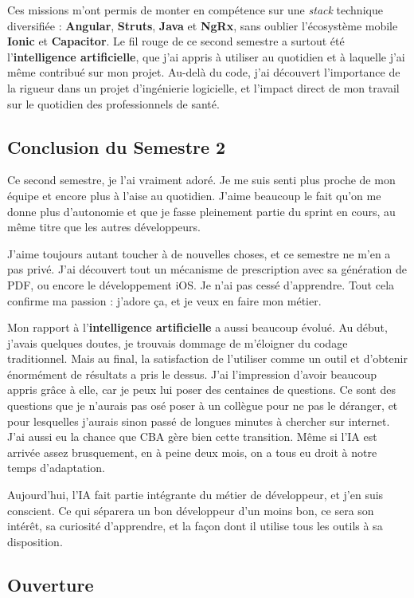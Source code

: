 \documentclass{article}
\begin{document}
Ces missions m'ont permis de monter en compétence sur une \textit{stack} technique diversifiée : \textbf{Angular}, \textbf{Struts}, \textbf{Java} et \textbf{NgRx}, sans oublier l'écosystème mobile \textbf{Ionic} et \textbf{Capacitor}. Le fil rouge de ce second semestre a surtout été l'\textbf{intelligence artificielle}, que j'ai appris à utiliser au quotidien et à laquelle j'ai même contribué sur mon projet. Au-delà du code, j'ai découvert l'importance de la rigueur dans un projet d'ingénierie logicielle, et l'impact direct de mon travail sur le quotidien des professionnels de santé.

\subsection{Conclusion du Semestre 2}
Ce second semestre, je l'ai vraiment adoré. Je me suis senti plus proche de mon équipe et encore plus à l'aise au quotidien. J'aime beaucoup le fait qu'on me donne plus d'autonomie et que je fasse pleinement partie du sprint en cours, au même titre que les autres développeurs.

J'aime toujours autant toucher à de nouvelles choses, et ce semestre ne m'en a pas privé. J'ai découvert tout un mécanisme de prescription avec sa génération de PDF, ou encore le développement iOS. Je n'ai pas cessé d'apprendre. Tout cela confirme ma passion : j'adore ça, et je veux en faire mon métier.

Mon rapport à l'\textbf{intelligence artificielle} a aussi beaucoup évolué. Au début, j'avais quelques doutes, je trouvais dommage de m'éloigner du codage traditionnel. Mais au final, la satisfaction de l'utiliser comme un outil et d'obtenir énormément de résultats a pris le dessus. J'ai l'impression d'avoir beaucoup appris grâce à elle, car je peux lui poser des centaines de questions. Ce sont des questions que je n'aurais pas osé poser à un collègue pour ne pas le déranger, et pour lesquelles j'aurais sinon passé de longues minutes à chercher sur internet. J'ai aussi eu la chance que CBA gère bien cette transition. Même si l'IA est arrivée assez brusquement, en à peine deux mois, on a tous eu droit à notre temps d'adaptation.

Aujourd'hui, l'IA fait partie intégrante du métier de développeur, et j'en suis conscient. Ce qui séparera un bon développeur d'un moins bon, ce sera son intérêt, sa curiosité d'apprendre, et la façon dont il utilise tous les outils à sa disposition.

\subsection{Ouverture}
\end{document}
